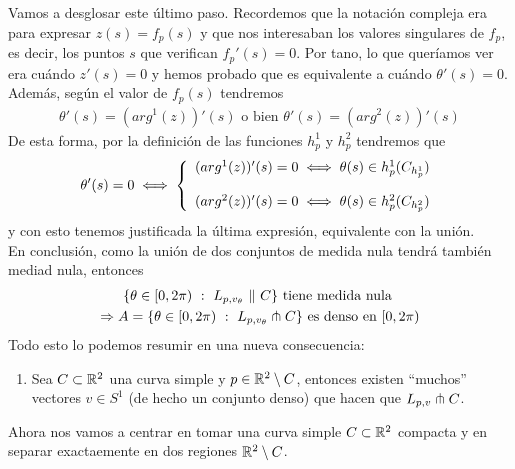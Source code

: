 Vamos a desglosar este último paso. Recordemos que la notación compleja era para expresar $z(s)=f_p(s)$ y que nos interesaban los valores singulares de $f_p$, es decir, los puntos $s$ que verifican $f_p'(s)=0$. Por tano, lo que queríamos ver era cuándo $z'(s)=0$ y hemos probado que es equivalente a cuándo $\theta'(s)=0$. Además, según el valor de $f_p(s)$ tendremos 
\begin{gather*}
    \theta'(s) = (arg^1(z))'(s)  \text{ o bien } \theta'(s) = (arg^2(z))'(s)
\end{gather*}
De esta forma, por la definición de las funciones $h_p^1$ y $h_p^2$ tendremos que 
\begin{gather*}
    \theta'(s) = 0 \iff
    \left\{
        \begin{array}{l}
            (arg^1(z))'(s) = 0 \iff \theta(s)\in h_p^1(C_{h_p^1})\\[1.25em]
            (arg^2(z))'(s) = 0 \iff \theta(s)\in h_p^2(C_{h_p^2})
        \end{array}
    \right.
\end{gather*}
y con esto tenemos justificada la última expresión, equivalente con la unión.\\

En conclusión, como la unión de dos conjuntos de medida nula tendrá también mediad nula, entonces
\begin{gather*}
    \{\theta\in[0,2\pi) \ : \ L_{p,v_\theta} \ \| \ C\} \text{ tiene medida nula } \\
    \Rightarrow A = \{\theta \in [0,2\pi) \ : \ L_{p,v_\theta} \pitchfork C\} \text{ es denso en $[0,2\pi)$}
\end{gather*}
Todo esto lo podemos resumir en una nueva consecuencia:

\begin{enumerate}[start=5]
    \item\label{cons:5} Sea $C \subset \mathbb{R}^2$ una curva simple y $p\in \mathbb{R}^2 \setminus C$, entonces existen ``muchos'' vectores $v\in S^1$ (de hecho un conjunto denso) que hacen que $L_{p,v}\pitchfork C$.
\end{enumerate}

Ahora nos vamos a centrar en tomar una curva simple $C\subset \mathbb{R}^2$ compacta y en separar exactaemente en dos regiones $\mathbb{R}^2 \setminus C$. \\

